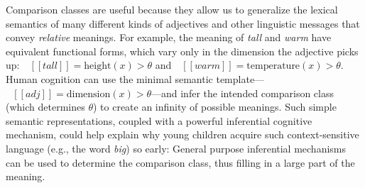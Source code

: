 \documentclass[doc]{apa6}
\newcommand{\denote}[1]{\mbox{ $[\![ #1 ]\!]$}}
\newcommand{\mht}[1]{\textcolor{Blue}{[mht: #1]}}
\begin{document}


Comparison classes are useful because they allow us to generalize the lexical semantics of many different kinds of adjectives and other linguistic messages that convey \emph{relative} meanings. 
For example, the meaning of \emph{tall} and \emph{warm} have equivalent functional forms, which vary only in the dimension the adjective picks up: $\denote{tall} = \text{height}(x) > \theta$ and $\denote{warm} = \text{temperature}(x) > \theta$. 
Human cognition can use the minimal semantic template---$\denote{adj} = \text{dimension}(x) > \theta$---and infer the intended comparison class (which determines $\theta$) to create an infinity of possible meanings.
Such simple semantic representations, coupled with a powerful inferential cognitive mechanism, could help explain why young children acquire such context-sensitive language (e.g., the word \emph{big}) so early: General purpose inferential mechanisms can be used to determine the comparison class, thus filling in a large part of the meaning. 
\end{document}
